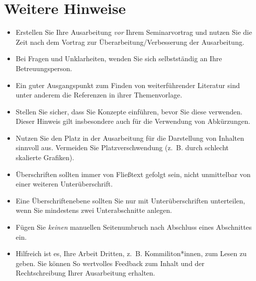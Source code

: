 \documentclass[lang=english]{secseminar}
\begin{document}
\section{Weitere Hinweise}
\begin{itemize}
\item Erstellen Sie Ihre Ausarbeitung \emph{vor} Ihrem Seminarvortrag und nutzen Sie die Zeit nach
  dem Vortrag zur Überarbeitung/Verbesserung der Ausarbeitung.
\item Bei Fragen und Unklarheiten, wenden Sie sich selbstständig an Ihre Betreuungsperson.
\item Ein guter Ausgangspunkt zum Finden von weiterführender Literatur sind unter anderem die
  Referenzen in ihrer Themenvorlage.
\item Stellen Sie sicher, dass Sie Konzepte einführen, bevor Sie diese verwenden. Dieser Hinweis
  gilt insbesondere auch für die Verwendung von Abkürzungen.
\item Nutzen Sie den Platz in der Ausarbeitung für die Darstellung von Inhalten sinnvoll
  aus. Vermeiden Sie Platzverschwendung (z.~B. durch schlecht skalierte Grafiken).
\item Überschriften sollten immer von Fließtext gefolgt sein, nicht unmittelbar von einer weiteren
  Unterüberschrift.
\item Eine Überschriftenebene sollten Sie nur mit Unterüberschriften unterteilen, wenn Sie
  mindestens zwei Unterabschnitte anlegen.
\item Fügen Sie \emph{keinen} manuellen Seitenumbruch nach Abschluss eines Abschnittes ein.
\item Hilfreich ist es, Ihre Arbeit Dritten, z.~B. Kommiliton*innen, zum Lesen zu geben. Sie können So
  wertvolles Feedback zum Inhalt und der Rechtschreibung Ihrer Ausarbeitung erhalten.
\end{itemize}




\end{document}
